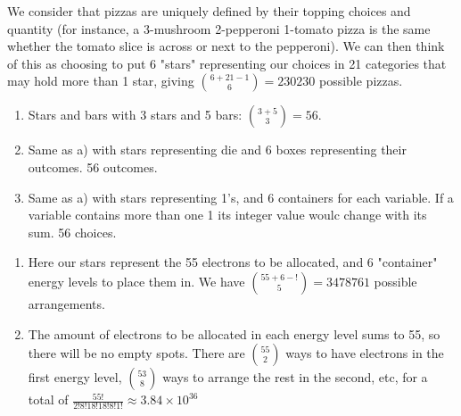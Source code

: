 \documentclass{article}
\begin{document}
\begin{prob}
    We consider that pizzas are uniquely defined by their topping choices and quantity (for instance, a 3-mushroom 2-pepperoni 1-tomato pizza is the same whether the tomato slice is across or next to the pepperoni). We can then think of this as choosing to put 6 "stars" representing our choices in 21 categories that may hold more than 1 star, giving ${6+21-1 \choose 6}=230230$ possible pizzas.
\end{prob}

\begin{prob}
    \begin{enumerate}
        \item Stars and bars with 3 stars and 5 bars: ${3+5 \choose 3}= 56$.
        \item Same as a) with stars representing die and 6 boxes representing their outcomes. 56 outcomes.
        \item Same as a) with stars representing 1's, and 6 containers for each variable. If a variable contains more than one 1 its integer value woulc change with its sum. 56 choices.
    \end{enumerate}
\end{prob}

\begin{prob}
    \begin{enumerate}
        \item Here our stars represent the 55 electrons to be allocated, and 6 "container" energy levels to place them in. We have ${55+6-! \choose 5}=3478761$ possible arrangements.
        \item The amount of electrons to be allocated in each energy level sums to 55, so there will be no empty spots. There are ${55 \choose 2}$ ways to have electrons in the first energy level, ${53 \choose 8}$ ways to arrange the rest in the second, etc, for a total of $\frac{55!}{2!8!18!18!8!1!}\approx3.84\times10^{36}$
    \end{enumerate}
\end{prob}
\end{document}
